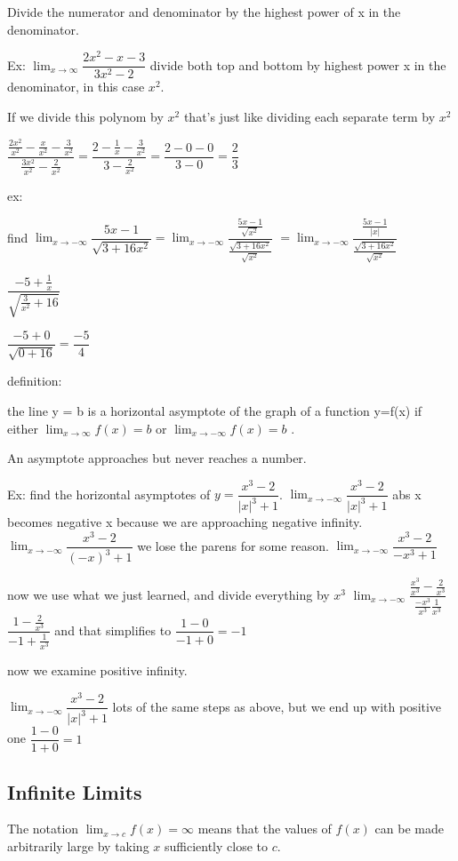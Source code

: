 \documentclass[12pt]{article}
\begin{document}
Divide the numerator and denominator by the highest power of x in the denominator.

Ex: $\lim_{x \to \infty}\dfrac{2x^2-x-3}{3x^2-2}$
divide both top and bottom by highest power x in the denominator, in this case $x^2$.

If we divide this polynom by $x^2$ that's just like dividing each separate term by $x^2$

$\dfrac{\frac{2x^2}{x^2}- \frac{x}{x^2} -\frac{3}{x^2}}{\frac{3x^2}{x^2} - \frac{2}{x^2}} = \dfrac{2-\frac{1}{x}-\frac{3}{x^2}}{3-\frac{2}{x^2}} = \dfrac{2-0-0}{3-0} = \dfrac{2}{3}$

ex:

find $\lim_{x\to-\infty}\dfrac{5x-1}{\sqrt{3+16x^2}} =
\lim_{x\to-\infty}\dfrac{\frac{5x-1}{\sqrt{x^2}}}{\frac{\sqrt{3+16x^2}}{\sqrt{x^2}}}$ 
$=  \lim_{x\to-\infty}\dfrac{\frac{5x-1}{|x|}} {\frac{\sqrt{3+16x^2}}{\sqrt{x^2}}}$

$\dfrac{-5+\frac{1}{x}}{\sqrt{\frac{3}{x^2}+16}}$

$\dfrac{-5+0}{\sqrt{0+16}} = \dfrac{-5}{4}$

definition:

the line y = b is a horizontal asymptote of the graph of a function y=f(x) if either $\lim_{x\to\infty}f(x)=b$
or $\lim_{x\to -\infty}f(x)=b$ .

An asymptote approaches but never reaches a number.

Ex: find the horizontal asymptotes of $y=\dfrac{x^3-2}{|x|^3+1}$.
$\lim_{x\to -\infty}\dfrac{x^3-2}{|x|^3+1}$
abs x becomes negative x because we are approaching negative infinity.
$\lim_{x\to -\infty}\dfrac{x^3-2}{(-x)^3+1}$
we lose the parens for some reason.
$\lim_{x\to -\infty}\dfrac{x^3-2}{-x^3+1}$

now we use what we just learned, and divide everything by $x^3$
$\lim_{x\to -\infty}\dfrac{\frac{x^3}{x^3}-\frac{2}{x^3}}{\frac{-x^3}{x^3}\frac{1}{x^3}}$
$\dfrac{1-\frac{2}{x^3}}{-1+\frac{1}{x^3}}$
and that simplifies to
$\dfrac{1-0}{-1+0} = -1$

now we examine positive infinity.

$\lim_{x\to -\infty}\dfrac{x^3-2}{|x|^3+1}$
lots of the same steps as above, but we end up with positive one
$\dfrac{1-0}{1+0} = 1$

\subsection{Infinite Limits}
The notation $\lim_{x\to c}f(x)=\infty$ means that the values of $f(x)$ can be made arbitrarily large by taking
$x$ sufficiently close to $c$.
\end{document}
